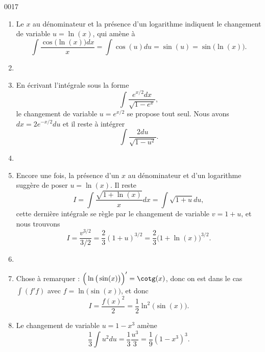 \begin{corrige}{0017}
\begin{enumerate}
\item
Le $x$ au dénominateur et la présence d'un logarithme indiquent le changement de variable $u=\ln(x)$, qui amène à
\begin{equation}
	\int\frac{ \cos\big( \ln(x) \big)dx }{ x }=\int\cos(u)du=\sin(u)=\sin\big( \ln(x) \big).
\end{equation}

\item
\item
En écrivant l'intégrale sous la forme
\begin{equation}
	\int\frac{  e^{x/2}dx }{ \sqrt{1- e^{x}} },
\end{equation}
le changement de variable $u= e^{x/2}$ se propose tout seul. Nous avons $dx=2 e^{-x/2}du$ et il reste à intégrer
\begin{equation}
	\int\frac{ 2du }{ \sqrt{1-u^2} }.
\end{equation}

\item
\item
Encore une fois, la présence d'un $x$ au dénominateur et d'un logarithme suggère de poser $u=\ln(x)$. Il reste
\begin{equation}
	I=\int\frac{ \sqrt{1+\ln(x)} }{ x }dx=\int\sqrt{1+u}du,
\end{equation}
cette dernière intégrale se règle par le changement de variable $v=1+u$, et nous trouvons
\begin{equation}
	I=\frac{ v^{3/2} }{ 3/2 }=\frac{ 2 }{ 3 }(1+u)^{3/2}=\frac{ 2 }{ 3 }\big(1+\ln(x)\big)^{3/2}.
\end{equation}

\item
\item
Chose à remarquer : $\Big( \ln\big( \sin(x) \big) \Big)'=\cotg(x)$, donc on est dans le cas $\int(f'f)$ avec $f=\ln\big( \sin(x) \big)$, et donc
\begin{equation}
	I=\frac{ f(x)^2 }{2}=\frac{ 1 }{2}\ln^2\big( \sin(x) \big).
\end{equation}

\item
Le changement de variable $u=1-x^3$ amène
\begin{equation}
	\frac{1}{ 3 }\int u^2du=\frac{1}{ 3 }\frac{ u^3 }{ 3 }=\frac{1}{ 9 }(1-x^3)^3.
\end{equation}
\end{enumerate}



\end{corrige}
